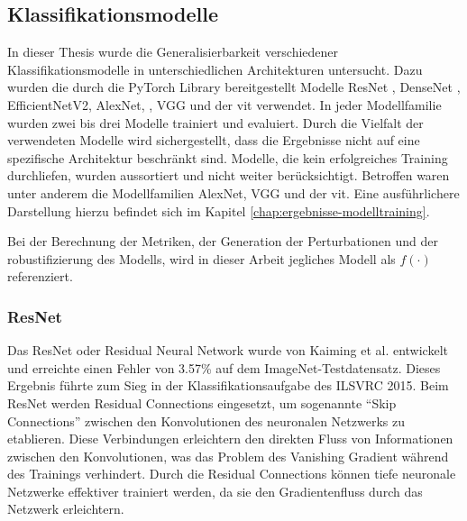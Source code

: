 \subsection{Klassifikationsmodelle} \label{chap:klassifikationsmodelle}
In dieser Thesis wurde die Generalisierbarkeit verschiedener Klassifikationsmodelle in unterschiedlichen Architekturen untersucht. Dazu wurden die durch die PyTorch Library bereitgestellt Modelle ResNet \cite{he_deep_2015}, DenseNet \cite{huang_densely_2018}, EfficientNetV2, \cite{tan_efficientnetv2_2021} AlexNet, \cite{krizhevsky_imagenet_2012}, VGG \cite{simonyan_very_2015} und der \acrfull{vit} \cite{dosovitskiy_image_2021} verwendet. In jeder Modellfamilie wurden zwei bis drei Modelle trainiert und evaluiert. Durch die Vielfalt der verwendeten Modelle wird sichergestellt, dass die Ergebnisse nicht auf eine spezifische Architektur beschränkt sind. Modelle, die kein erfolgreiches Training durchliefen, wurden aussortiert und nicht weiter berücksichtigt. Betroffen waren unter anderem die Modellfamilien AlexNet, VGG und der \acrfull{vit}. Eine ausführlichere Darstellung hierzu befindet sich im Kapitel \ref{chap:ergebnisse-modelltraining}.

Bei der Berechnung der Metriken, der Generation der Perturbationen und der \Gls{robustifizierung} des Modells, wird in dieser Arbeit jegliches Modell als $f(\cdot)$ referenziert.

\subsubsection{ResNet}
Das ResNet oder Residual Neural Network wurde von Kaiming et al. \cite{he_deep_2015} entwickelt und erreichte einen Fehler von 3.57\% auf dem ImageNet-Testdatensatz. Dieses Ergebnis führte zum Sieg in der Klassifikationsaufgabe des ILSVRC 2015. Beim ResNet werden Residual Connections eingesetzt, um sogenannte ``Skip Connections'' zwischen den Konvolutionen des neuronalen Netzwerks zu etablieren. Diese Verbindungen erleichtern den direkten Fluss von Informationen zwischen den Konvolutionen, was das Problem des Vanishing Gradient während des Trainings verhindert. Durch die Residual Connections können tiefe neuronale Netzwerke effektiver trainiert werden, da sie den Gradientenfluss durch das Netzwerk erleichtern.

